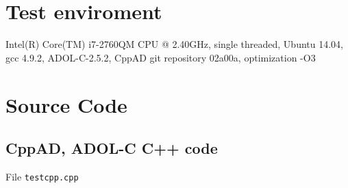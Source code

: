 \documentclass{amsart}
\theoremstyle{plain}
\numberwithin{equation}{section}
\begin{document}
\section{Test enviroment}

Intel(R) Core(TM) i7-2760QM CPU @ 2.40GHz, single threaded, Ubuntu 14.04, gcc 4.9.2, ADOL-C-2.5.2, CppAD git repository 02a00a, optimization -O3

\section{Source Code}


\subsection{CppAD, ADOL-C C++ code}

File \verb+testcpp.cpp+
\end{document}

